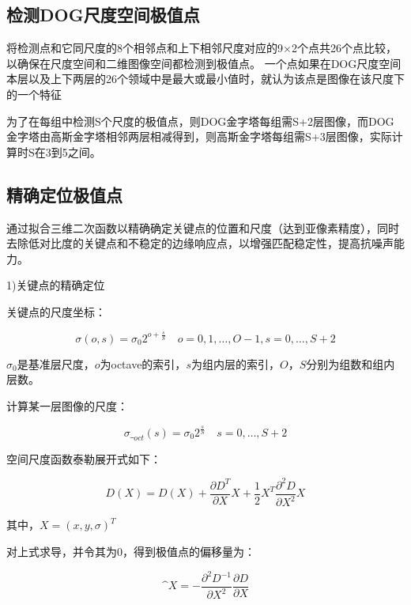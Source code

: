 \documentclass[12pt]{article}
\numberwithin{equation}{section}%
\begin{document}
\subsection{检测DOG尺度空间极值点}

将检测点和它同尺度的8个相邻点和上下相邻尺度对应的9×2个点共26个点比较，以确保在尺度空间和二维图像空间都检测到极值点。 一个点如果在DOG尺度空间本层以及上下两层的26个领域中是最大或最小值时，就认为该点是图像在该尺度下的一个特征


为了在每组中检测S个尺度的极值点，则DOG金字塔每组需S+2层图像，而DOG金字塔由高斯金字塔相邻两层相减得到，则高斯金字塔每组需S+3层图像，实际计算时S在3到5之间。




\subsection{精确定位极值点}

通过拟合三维二次函数以精确确定关键点的位置和尺度（达到亚像素精度），同时去除低对比度的关键点和不稳定的边缘响应点，以增强匹配稳定性，提高抗噪声能力。

1)关键点的精确定位

关键点的尺度坐标：

\begin{equation}
\sigma(o,s)=\sigma_{0}2^{o+\frac{s}{S}}  \quad o=0,1,\ldots,O-1, s=0,\ldots,S+2
\end{equation}

$\sigma_{0}$是基准层尺度，$o$为octave的索引，$s$为组内层的索引，$O，S$分别为组数和组内层数。

计算某一层图像的尺度：

\begin{equation}
\sigma\__{oct}(s)=\sigma_{0}2^{\frac{s}{S}}  \quad s=0,\ldots,S+2
\end{equation}


空间尺度函数泰勒展开式如下：

\begin{equation}
D(X)=D(X)+\frac{\partial D^{T}}{\partial X}X+\frac{1}{2}X^{T}\frac{\partial ^{2}D}{\partial X^{2}}X
\end{equation}

其中，$X=(x,y,\sigma)^{T}$

对上式求导，并令其为0，得到极值点的偏移量为：

\begin{equation}
\^{X}=-\frac{\partial ^{2}D^{-1}}{\partial X^{2}}\frac{\partial D}{\partial X}
\end{equation}
\end{document}
